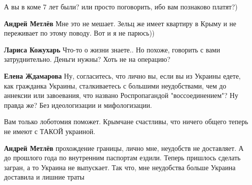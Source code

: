 \begin{itemize}
\begin{itemize}
А вы в коме 7 лет были? или просто поговорить, ибо вам познаково платят?)

 
\textbf{Андрей Метлёв} Мне это не мешает. Зельц же имеет квартиру в Крыму и не переживает по этому поводу. Вот и я не парюсь))

 
\textbf{Лариса Кожухарь} Что-то о жизни знаете.. Но похоже, говорить с вами затруднительно. Деньги нужны?
Хоть не на операцию?

 
\textbf{Елена Ждамарова} Ну, согласитесь, что лично вы, если вы из Украины едете, как гражданка Украины, сталкиваетесь с большими неудобствами,
чем до аннексии или завоевания,
что названо Роспропагандой "воссоединением"?
Ну правда же?
Без идеологизации и мифологизации.

 
Вам только лоботомия поможет. Крымчане счастливы, что ничего общего теперь не
имеют с ТАКОЙ украиной.

 
\textbf{Андрей Метлёв} прохождение границы, лично мне, неудобств не доставляет.
А до прошлого года по внутренним паспортам ездили. Теперь пришлось сделать
загран, а то Украина не выпускает. Так что, мне неудобства больше Украина
доставила и лишние траты


\end{itemize}
\end{itemize}
